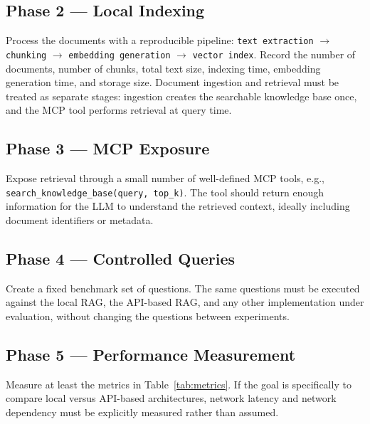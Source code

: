 \documentclass[11pt,a4paper]{article}
\begin{document}
\subsection{Phase 2 --- Local Indexing}

Process the documents with a reproducible pipeline:
\texttt{text extraction} $\rightarrow$ \texttt{chunking} $\rightarrow$
\texttt{embedding generation} $\rightarrow$ \texttt{vector index}. Record the
number of documents, number of chunks, total text size, indexing time,
embedding generation time, and storage size. Document ingestion and retrieval
must be treated as separate stages: ingestion creates the searchable
knowledge base once, and the MCP tool performs retrieval at query time.

\subsection{Phase 3 --- MCP Exposure}

Expose retrieval through a small number of well-defined MCP tools, e.g.,
\texttt{search\_knowledge\_base(query, top\_k)}. The tool should return enough
information for the LLM to understand the retrieved context, ideally including
document identifiers or metadata.

\subsection{Phase 4 --- Controlled Queries}

Create a fixed benchmark set of questions. The same questions must be
executed against the local RAG, the API-based RAG, and any other
implementation under evaluation, without changing the questions between
experiments.

\subsection{Phase 5 --- Performance Measurement}

Measure at least the metrics in Table~\ref{tab:metrics}. If the goal is
specifically to compare local versus API-based architectures, network latency
and network dependency must be explicitly measured rather than assumed.
\end{document}
